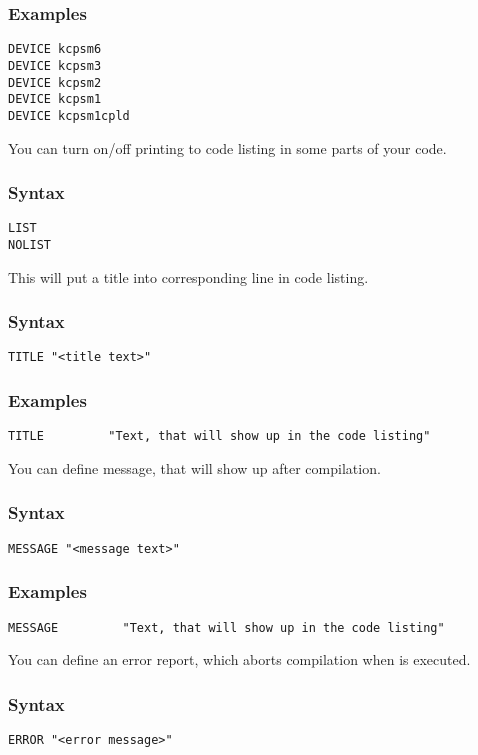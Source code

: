     \subsubsection{Examples}
        \verb'DEVICE kcpsm6'\\
        \verb'DEVICE kcpsm3'\\
        \verb'DEVICE kcpsm2'\\
        \verb'DEVICE kcpsm1'\\
        \verb'DEVICE kcpsm1cpld'

    You can turn on/off printing to code listing in some parts of your code.

    \subsubsection{Syntax}
        \verb'LIST'\\
        \verb'NOLIST'

    This will put a title into corresponding line in code listing.

    \subsubsection{Syntax}
        \verb'TITLE "<title text>"'

    \subsubsection{Examples}
        \verb'TITLE         "Text, that will show up in the code listing"'

    You can define message, that will show up after compilation.

    \subsubsection{Syntax}
        \verb'MESSAGE "<message text>"'

    \subsubsection{Examples}
        \verb'MESSAGE         "Text, that will show up in the code listing"'

    You can define an error report, which aborts compilation when is executed.

    \subsubsection{Syntax}
        \verb'ERROR "<error message>"'

